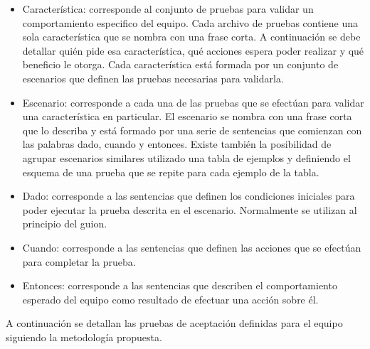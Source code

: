 \begin{itemize}
	\item Característica: corresponde al conjunto de pruebas para validar un comportamiento especifico del equipo. Cada archivo de pruebas contiene una sola característica que se nombra con una frase corta. A continuación se debe detallar quién pide esa característica, qué acciones espera poder realizar y qué beneficio le otorga. Cada característica está formada por un conjunto de escenarios que definen las pruebas necesarias para validarla. 
	\item Escenario: corresponde a cada una de las pruebas que se efectúan para validar una característica en particular. El escenario se nombra con una frase corta que lo describa y está formado por una serie de sentencias que comienzan con las palabras dado, cuando y entonces. Existe también la posibilidad de agrupar escenarios similares utilizado una tabla de ejemplos y definiendo el esquema de una prueba que se repite para cada ejemplo de la tabla.
	\item Dado: corresponde a las sentencias que definen los condiciones iniciales para poder ejecutar la prueba descrita en el escenario. Normalmente se utilizan al principio del guion.
	\item Cuando: corresponde a las sentencias que definen las acciones que se efectúan para completar la prueba.
	\item Entonces: corresponde a las sentencias que describen el comportamiento esperado del equipo como resultado de efectuar una acción sobre él.
\end{itemize}

A continuación se detallan las pruebas de aceptación definidas para el equipo siguiendo la metodología propuesta.

\vspace{4mm}



\vspace{8mm}



\newpage





\newpage



